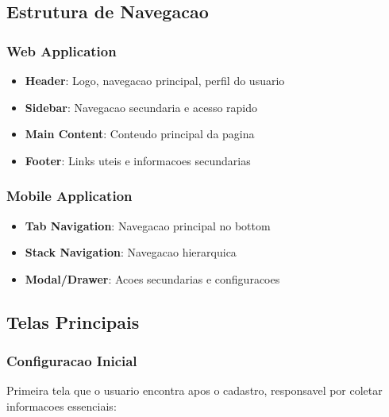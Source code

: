\subsection{Estrutura de Navegacao}

\subsubsection{Web Application}
\begin{itemize}
    \item \textbf{Header}: Logo, navegacao principal, perfil do usuario
    \item \textbf{Sidebar}: Navegacao secundaria e acesso rapido
    \item \textbf{Main Content}: Conteudo principal da pagina
    \item \textbf{Footer}: Links uteis e informacoes secundarias
\end{itemize}

\subsubsection{Mobile Application}
\begin{itemize}
    \item \textbf{Tab Navigation}: Navegacao principal no bottom
    \item \textbf{Stack Navigation}: Navegacao hierarquica
    \item \textbf{Modal/Drawer}: Acoes secundarias e configuracoes
\end{itemize}

\subsection{Telas Principais}

\subsubsection{Configuracao Inicial}

Primeira tela que o usuario encontra apos o cadastro, responsavel por coletar informacoes essenciais:

